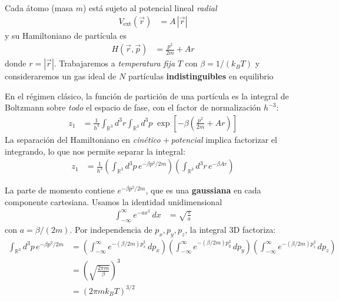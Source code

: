 \documentclass{article}
\begin{document}
Cada átomo (masa $m$) está sujeto al potencial lineal \textit{radial}
\begin{equation}
\begin{split}
V_{\text{ext}}(\vec r)
&= A\,|\vec r| 
\end{split}\label{eq:Vext_trampa_lineal_desarrollo}
\end{equation}
y su Hamiltoniano de partícula es
\begin{equation}
\begin{split}
H(\vec r,\vec p)
&= \frac{p^2}{2m}+A r
\end{split}\label{eq:H_particula_desarrollo}
\end{equation}
donde $r=|\vec r|$. Trabajaremos a \textit{temperatura fija} $T$ con $\beta=1/(k_B T)$ y consideraremos un gas ideal de $N$ partículas \textbf{indistinguibles} en equilibrio



En el régimen clásico, la función de partición de una partícula es la integral de Boltzmann sobre \textit{todo} el espacio de fase, con el factor de normalización $h^{-3}$:
\begin{equation}
\begin{split}
z_1
&= \frac{1}{h^3}\int_{\mathbb{R}^3}\!\!\!d^3r\int_{\mathbb{R}^3}\!\!\!d^3p\;\exp\!\left[-\beta\left(\frac{p^2}{2m}+A r\right)\right]
\end{split}\label{eq:z1_def_espacio_fase}
\end{equation}
La separación del Hamiltoniano en \textit{cinético} $+\,$\textit{potencial} implica factorizar el integrando, lo que nos permite separar la integral:
\begin{equation}
\begin{split}
z_1
&= \frac{1}{h^3}\left(\int_{\mathbb{R}^3}\!d^3p\,e^{-\beta p^2/2m}\right)
\left(\int_{\mathbb{R}^3}\!d^3r\,e^{-\beta A r}\right)
\end{split}\label{eq:z1_separada_espacio_fase}
\end{equation}



La parte de momento contiene $e^{-\beta p^2/2m}$, que es una \textbf{gaussiana} en cada componente cartesiana. Usamos la identidad unidimensional
\begin{equation}
\begin{split}
\int_{-\infty}^{\infty} e^{-a x^2}\,dx
&= \sqrt{\frac{\pi}{a}}
\end{split}\label{eq:gauss_1D_identidad}
\end{equation}
con $a=\beta/(2m)$. Por independencia de $p_x,p_y,p_z$, la integral 3D factoriza:
\begin{equation}
\begin{split}
\int_{\mathbb{R}^3} d^3p\,e^{-\beta p^2/2m}
&= \left(\int_{-\infty}^{\infty} e^{-(\beta/2m) p_x^2}\,dp_x\right)
   \left(\int_{-\infty}^{\infty} e^{-(\beta/2m) p_y^2}\,dp_y\right)
   \left(\int_{-\infty}^{\infty} e^{-(\beta/2m) p_z^2}\,dp_z\right)\\
&= \left(\sqrt{\frac{2\pi m}{\beta}}\right)^3\\
&= \left(2\pi m k_B T\right)^{3/2}
\end{split}\label{eq:int_momento_gauss_3D}
\end{equation}
\end{document}
